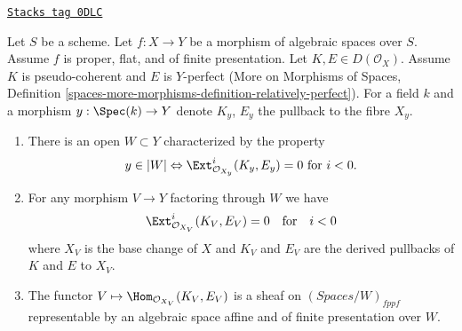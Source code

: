 \begin{lemma}
\label{quot-lemma-complexes-open-neg-exts-vanishing}
\href{https://stacks.math.columbia.edu/tag/0DLC}{\texttt{Stacks tag 0DLC}}

Let $S$ be a scheme.
Let $f : X \to Y$ be a morphism of algebraic spaces over $S$.
Assume $f$ is proper, flat, and of finite presentation.
Let $K, E \in D(\mathcal{O}_X)$. Assume $K$ is pseudo-coherent
and $E$ is $Y$-perfect (More on Morphisms of Spaces, Definition
\ref{spaces-more-morphisms-definition-relatively-perfect}).
For a field $k$ and a morphism $y : \Spec(k) \to Y$ denote $K_y$, $E_y$
the pullback to the fibre $X_y$.
\begin{enumerate}
\item There is an open $W \subset Y$ characterized by the property
$$
y \in |W|
\Leftrightarrow
\Ext^i_{\mathcal{O}_{X_y}}(K_y, E_y) = 0
\text{ for }i < 0.
$$
\item For any morphism $V \to Y$ factoring through $W$ we have
$$
\Ext^i_{\mathcal{O}_{X_V}}(K_V, E_V) = 0
\quad\text{for}\quad i < 0
$$
where $X_V$ is the base change of $X$ and $K_V$ and $E_V$
are the derived pullbacks of $K$ and $E$ to $X_V$.
\item The functor $V \mapsto \Hom_{\mathcal{O}_{X_V}}(K_V, E_V)$
is a sheaf on $(\textit{Spaces}/W)_{fppf}$ representable by an
algebraic space affine and of finite presentation over $W$.
\end{enumerate}
\end{lemma}

